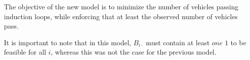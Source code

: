 The objective of the new model is to minimize the number of vehicles passing induction loops, while enforcing that at least the observed number of vehicles pass.

It is important to note that in this model, $B_{i\cdot}$ must contain at least $one$ $1$ to be feasible for all $i$, whereas this was not the case for the previous model.